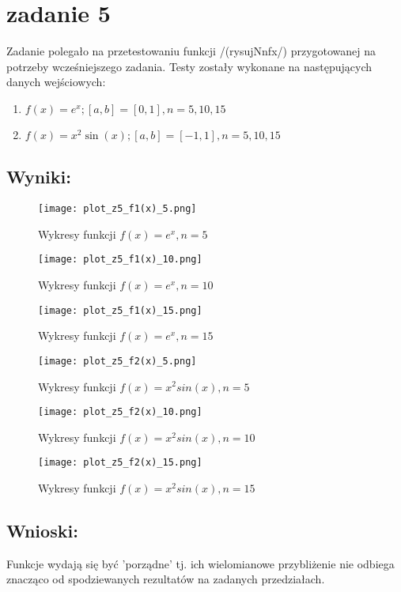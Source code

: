 \section{zadanie 5}
Zadanie polegało na przetestowaniu funkcji /(rysujNnfx/) przygotowanej na potrzeby wcześniejszego zadania. Testy zostały wykonane na następujących danych wejściowych:
\begin{enumerate}
  \item \(f(x) = e^x; [a, b] = [0, 1], n = 5, 10, 15 \)
  \item \(f(x) = x^2\sin(x); [a, b] = [-1, 1], n = 5, 10, 15 \)
\end{enumerate}

\subsection{Wyniki:}

\begin{figure}[ht]
  \centering
  \texttt{[image: plot\_z5\_f1(x)\_5.png]}
  \caption{Wykresy funkcji \(f(x) = e^x, n = 5\)}
\end{figure}

\begin{figure}[ht]
  \centering
  \texttt{[image: plot\_z5\_f1(x)\_10.png]}
  \caption{Wykresy funkcji \(f(x) = e^x, n = 10\)}
\end{figure}

\begin{figure}[ht]
  \centering
  \texttt{[image: plot\_z5\_f1(x)\_15.png]}
  \caption{Wykresy funkcji \(f(x) = e^x, n = 15\)}
\end{figure}

\begin{figure}[ht]
  \centering
  \texttt{[image: plot\_z5\_f2(x)\_5.png]}
  \caption{Wykresy funkcji \(f(x) = x^2sin(x), n = 5\)}
\end{figure}

\begin{figure}[ht]
  \centering
  \texttt{[image: plot\_z5\_f2(x)\_10.png]}
  \caption{Wykresy funkcji \(f(x) = x^2sin(x), n = 10\)}
\end{figure}

\begin{figure}[ht]
  \centering
  \texttt{[image: plot\_z5\_f2(x)\_15.png]}
  \caption{Wykresy funkcji \(f(x) = x^2sin(x), n = 15\)}
\end{figure}



\subsection{Wnioski:}
Funkcje wydają się być 'porządne' tj. ich wielomianowe przybliżenie nie odbiega znacząco od spodziewanych rezultatów na zadanych przedziałach.
